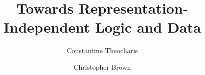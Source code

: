 \begin{frontmatter}
  \title{Towards Representation-Independent Logic and Data}
  \author{Constantine Theocharis}
  \author{Christopher Brown}
  \address{%
    University of St Andrews \\
    St Andrews, Fife, UK
  }


\end{frontmatter}
